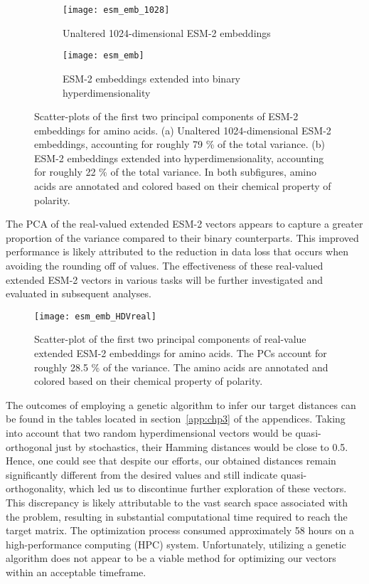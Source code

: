 \begin{figure}[H]
\centering
\begin{subfigure}[b]{0.4\textwidth}
    \texttt{[image: esm\_emb\_1028]}
    \caption{Unaltered 1024-dimensional ESM-2 embeddings}
    \label{fig:AAesm_pure}
\end{subfigure}
    \hspace{1cm}
\begin{subfigure}[b]{0.4\textwidth}
    \texttt{[image: esm\_emb]}
    \caption{ESM-2 embeddings extended into binary hyperdimensionality}
    \label{fig:AAesm}
\end{subfigure}
\caption{Scatter-plots of the first two principal components of ESM-2 embeddings for amino acids. (a) Unaltered 1024-dimensional ESM-2 embeddings, accounting for roughly 79 \% of the total variance. (b) ESM-2 embeddings extended into hyperdimensionality, accounting for roughly 22 \% of the total variance. In both subfigures, amino acids are annotated and colored based on their chemical property of polarity.}
\label{fig:combined_ESM_embeddings}
\end{figure}

The PCA of the real-valued extended ESM-2 vectors appears to capture a greater proportion of the variance compared to their binary counterparts. This improved performance is likely attributed to the reduction in data loss that occurs when avoiding the rounding off of values. The effectiveness of these real-valued extended ESM-2 vectors in various tasks will be further investigated and evaluated in subsequent analyses.

\begin{figure}[H]
    \centering
    \texttt{[image: esm\_emb\_HDVreal]}
\caption{Scatter-plot of the first two principal components of real-value extended ESM-2 embeddings for amino acids. The PCs account for roughly 28.5 \% of the variance. The amino acids are annotated and colored based on their chemical property of polarity.}
\label{fig:AAesmreal}
\end{figure}

The outcomes of employing a genetic algorithm to infer our target distances can be found in the tables located in section~\ref{app:chp3} of the appendices. Taking into account that two random hyperdimensional vectors would be quasi-orthogonal just by stochastics, their Hamming distances would be close to 0.5. Hence, one could see that despite our efforts, our obtained distances remain significantly different from the desired values and still indicate quasi-orthogonality, which led us to discontinue further exploration of these vectors. This discrepancy is likely attributable to the vast search space associated with the problem, resulting in substantial computational time required to reach the target matrix. The optimization process consumed approximately 58 hours on a high-performance computing (HPC) system. Unfortunately, utilizing a genetic algorithm does not appear to be a viable method for optimizing our vectors within an acceptable timeframe.

